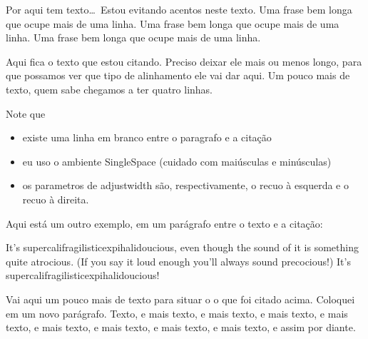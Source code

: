 \documentclass{memoir}
\begin{document}
Por aqui tem texto\ldots\ Estou evitando acentos neste texto.  Uma
frase bem longa que ocupe mais de uma linha. Uma frase bem longa que
ocupe mais de uma linha. Uma frase bem longa que ocupe mais de uma
linha.


\begin{SingleSpace}
\begin{adjustwidth}{0cm}{4cm}
Aqui fica o texto que estou citando. Preciso deixar ele mais ou menos
longo, para que possamos ver que tipo de alinhamento ele vai dar aqui.
Um pouco mais de texto, quem sabe chegamos a ter quatro linhas.
\end{adjustwidth}
\end{SingleSpace}

Note que
\begin{itemize}
\item existe uma linha em branco entre o paragrafo e a cita\c c\~ao
\item eu uso o ambiente SingleSpace (cuidado com mai\'usculas e min\'usculas)
\item os parametros de adjustwidth s\~ao, respectivamente, o recuo \`a esquerda e o recuo  \`a direita.
\end{itemize}

Aqui est\'a um outro exemplo, em um par\'agrafo entre o texto e a cita\c c\~ao:
\begin{SingleSpace}
\begin{adjustwidth}{4cm}{0cm}
It's supercalifragilisticexpihalidoucious, even though the sound of it
is something quite atrocious.  (If you say it loud enough you'll
always sound precocious!) It's supercalifragilisticexpihalidoucious!
\end{adjustwidth}
\end{SingleSpace}

Vai aqui um pouco mais de texto para situar o o que foi citado acima.
Coloquei em um novo par\'agrafo. Texto, e mais texto, e mais texto, e
mais texto, e mais texto, e mais texto, e mais texto, e mais texto, e
mais texto, e assim por diante.
\end{document}
